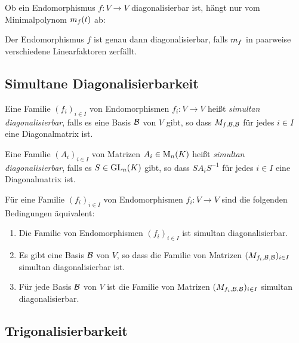 Ob ein Endomorphismus $f \colon V \to V$ diagonalisierbar ist, hängt nur vom Minimalpolynom $m_{f}(t)$ ab:

\begin{proposition}
  Der Endomorphismus $f$ ist genau dann diagonalisierbar, falls $m_{f}$ in paarweise verschiedene Linearfaktoren zerfällt.
\end{proposition}





\subsection{Simultane Diagonalisierbarkeit}

\begin{definition}
  Eine Familie $(f_i)_{i \in I}$ von Endomorphismen $f_i \colon V \to V$ heißt \emph{simultan diagonalisierbar}, falls es eine Basis $\mathcal{B}$ von $V$ gibt, so dass $M_{f, \mathcal{B}, \mathcal{B}}$ für jedes $i \in I$ eine Diagonalmatrix ist.
  
  Eine Familie $(A_i)_{i \in I}$ von Matrizen $A_i \in \operatorname{M}_{n}(K)$ heißt \emph{simultan diagonalisierbar}, falls es $S \in \operatorname{GL}_{n}(K)$ gibt, so dass $S A_i S^{-1}$ für jedes $i \in I$ eine Diagonalmatrix ist.
\end{definition}

\begin{lemma}
  Für eine Familie $(f_i)_{i \in I}$ von Endomorphismen $f_i \colon V \to V$ sind die folgenden Bedingungen äquivalent:
  \begin{enumerate}
    \item
      Die Familie von Endomorphismen $(f_i)_{i \in I}$ ist simultan diagonalisierbar.
    \item
      Es gibt eine Basis $\mathcal{B}$ von $V$, so dass die Familie von Matrizen $(M_{f_i, \mathcal{B}, \mathcal{B}})_{i \in I}$ simultan diagonalisierbar ist.
    \item
      Für jede Basis $\mathcal{B}$ von $V$ ist die Familie von Matrizen $(M_{f_i, \mathcal{B}, \mathcal{B}})_{i \in I}$ simultan diagonalisierbar.
  \end{enumerate}
\end{lemma}







\subsection{Trigonalisierbarkeit}

